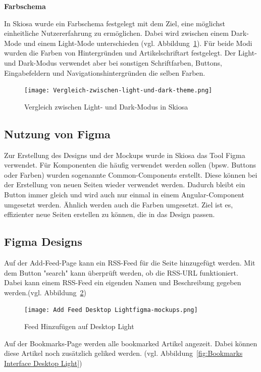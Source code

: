 \textbf{Farbschema}

In Skiosa wurde ein Farbschema festgelegt mit dem Ziel, 
eine möglichst einheitliche Nutzererfahrung zu ermöglichen. 
Dabei wird zwischen einem Dark-Mode und einem Light-Mode unterschieden (vgl. Abbildung~\ref{fig:Vergleich-light-dark}).
Für beide Modi wurden die Farben von Hintergründen und Artikelschriftart festgelegt.
Der Light- und Dark-Modus verwendet 
aber bei sonstigen Schriftfarben, Buttons, Eingabefeldern und Navigationshintergründen die selben Farben.

\begin{figure}[h]
    \texttt{[image: Vergleich-zwischen-light-und-dark-theme.png]}
    \caption{Vergleich zwischen Light- und Dark-Modus in Skiosa}
    \label{fig:Vergleich-light-dark}
\end{figure}

\subsection{Nutzung von Figma}

Zur Erstellung des Designs und der Mockups wurde in Skiosa das Tool Figma verwendet. 
Für Komponenten die häufig verwendet werden sollen (bpsw. Buttons oder Farben) wurden sogenannte Common-Components erstellt.
Diese können bei der Erstellung von neuen Seiten wieder verwendet werden. 
Dadurch bleibt ein Button immer gleich und wird auch nur einmal in einem Angular-Component umgesetzt werden.
Ähnlich werden auch die Farben umgesetzt. 
Ziel ist es, effizienter neue Seiten erstellen zu können, die in das Design passen.

\subsection{Figma Designs}

Auf der Add-Feed-Page kann ein RSS-Feed für die Seite hinzugefügt werden. Mit dem Button "search" kann überprüft werden, ob die RSS-URL funktioniert.
Dabei kann einem RSS-Feed ein eigenden Namen und Beschreibung gegeben werden.(vgl. Abbildung~\ref{fig:Add Feed Desktop Light}) 
\begin{figure}[H]
    \texttt{[image: Add Feed Desktop Lightfigma-mockups.png]}
    \caption{Feed Hinzufügen auf Desktop Light}
    \label{fig:Add Feed Desktop Light}
\end{figure}

Auf der Bookmarks-Page werden alle bookmarked Artikel angezeit.
Dabei können diese Artikel noch zusätzlich geliked werden. (vgl. Abbildung~\ref{fig:Bookmarks Interface Desktop Light})

